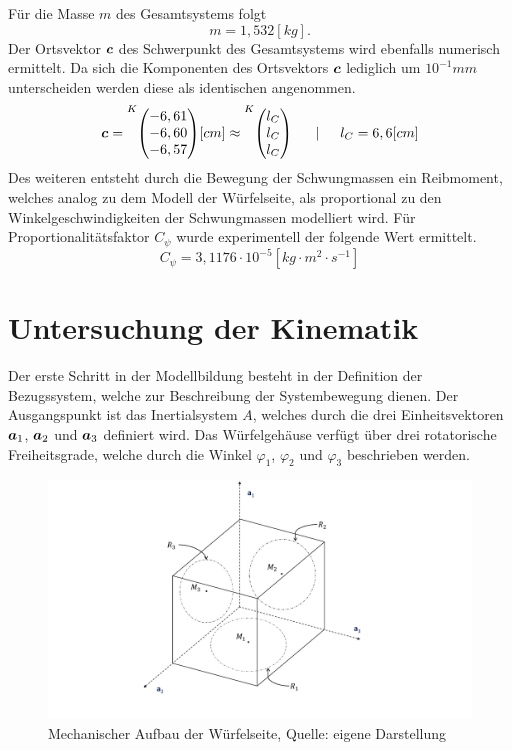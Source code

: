 Für die Masse $m$ des Gesamtsystems folgt
\begin{equation}
m = 1,532[kg].
\end{equation}
Der Ortsvektor $\boldsymbol{c}$ des Schwerpunkt des Gesamtsystems wird ebenfalls numerisch ermittelt. Da sich die Komponenten des Ortsvektors $\boldsymbol{c}$ lediglich um $10^{-1}mm$ unterscheiden werden diese als identischen angenommen.
\begin{equation}
\bs{c} = \vecBS{K}{-6,61}{-6,60}{-6,57}[cm] \approx \vecBS{K}{l_C}{l_C}{l_C} \hspace{15pt} \vert \hspace{15pt} l_C = 6,6[cm]
\end{equation}
Des weiteren entsteht durch die Bewegung der Schwungmassen ein Reibmoment, welches analog zu dem Modell der Würfelseite, als proportional zu den Winkelgeschwindigkeiten der Schwungmassen modelliert wird. Für Proportionalitätsfaktor $C_{\psi}$ wurde experimentell der folgende Wert ermittelt.
\begin{equation}
C_{\psi} = 3,1176\cdot 10^{-5}[kg\cdot m^2 \cdot s^{-1}]
\end{equation}

\section{Untersuchung der Kinematik}
Der erste Schritt in der Modellbildung besteht in der Definition der Bezugssystem, welche zur Beschreibung der Systembewegung dienen. Der Ausgangspunkt ist das Inertialsystem $A$, welches durch die drei Einheitsvektoren $\boldsymbol{a}_1$, $\boldsymbol{a}_2$ und $\boldsymbol{a}_3$ definiert wird. Das Würfelgehäuse verfügt über drei rotatorische Freiheitsgrade, welche durch die Winkel $\varphi_1$, $\varphi_2$ und $\varphi_3$ beschrieben werden. 

\begin{figure}[!h]
\centering
\includegraphics[width=\linewidth, trim={3cm 1.5cm 4cm 0cm}, clip]{img/MechAufbau3D}
\caption{Mechanischer Aufbau der Würfelseite, Quelle: eigene Darstellung}
\end{figure}

